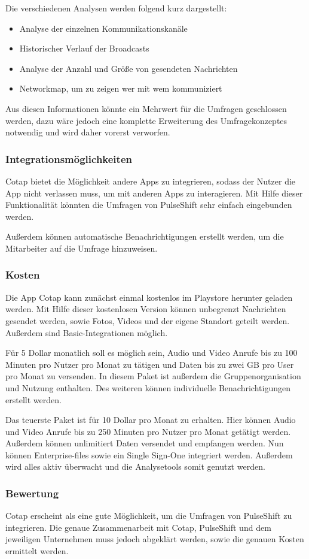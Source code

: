 Die verschiedenen Analysen werden folgend kurz dargestellt: 

\begin{itemize}
\item Analyse der einzelnen Kommunikationskanäle
\item Historischer Verlauf der Broadcasts
\item Analyse der Anzahl und Größe von gesendeten Nachrichten
\item Networkmap, um zu zeigen wer mit wem kommuniziert
\end{itemize}

Aus diesen Informationen könnte ein Mehrwert für die Umfragen geschlossen werden, dazu wäre jedoch eine komplette Erweiterung des Umfragekonzeptes notwendig und wird daher vorerst verworfen.

\subsubsection{Integrationsmöglichkeiten}
Cotap bietet die Möglichkeit andere Apps zu integrieren, sodass der Nutzer die App nicht verlassen muss, um mit anderen Apps zu interagieren. Mit Hilfe dieser Funktionalität könnten die Umfragen von PulseShift sehr einfach eingebunden werden. 

Außerdem können automatische Benachrichtigungen erstellt werden, um die Mitarbeiter auf die Umfrage hinzuweisen.

\subsubsection{Kosten}
Die App Cotap kann zunächst einmal kostenlos im Playstore herunter geladen werden. Mit Hilfe dieser kostenlosen Version können unbegrenzt Nachrichten gesendet werden, sowie Fotos, Videos und der eigene Standort geteilt werden. Außerdem sind Basic-Integrationen möglich. 

Für 5 Dollar monatlich soll es möglich sein, Audio und Video Anrufe bis zu 100 Minuten pro Nutzer pro Monat zu tätigen und Daten bis zu zwei GB pro User pro Monat zu versenden. In diesem Paket ist außerdem die Gruppenorganisation und Nutzung enthalten. Des weiteren können individuelle Benachrichtigungen erstellt werden.

Das teuerste Paket ist für 10 Dollar pro Monat zu erhalten. Hier können Audio und Video Anrufe bis zu 250 Minuten pro Nutzer pro Monat getätigt werden. Außerdem können unlimitiert Daten versendet und empfangen werden. Nun können Enterprise-files sowie ein Single Sign-One integriert werden. Außerdem wird alles aktiv überwacht und die Analysetools somit genutzt werden.

\subsubsection{Bewertung}
Cotap erscheint als eine gute Möglichkeit, um die Umfragen von PulseShift zu integrieren. Die genaue Zusammenarbeit mit Cotap, PulseShift und dem jeweiligen Unternehmen muss jedoch abgeklärt werden, sowie die genauen Kosten ermittelt werden.
